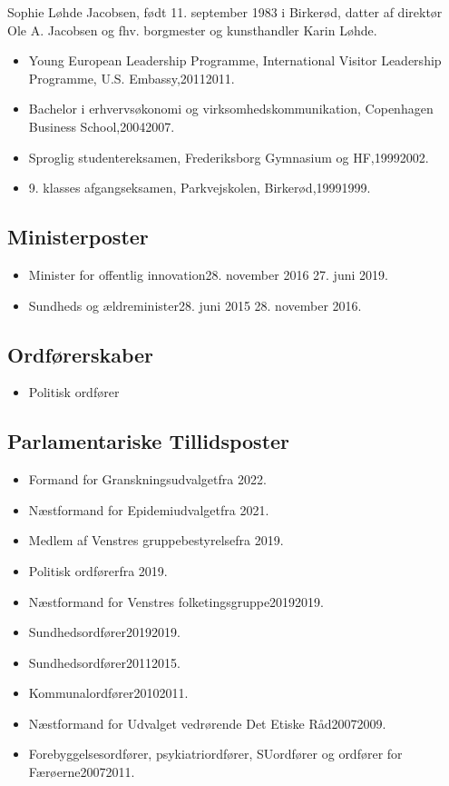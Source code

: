 \documentclass[11pt, a4paper]{awesome-cv}
\begin{document}
\makecvheader[R]
\makelettertitle
\begin{cvletter}
Sophie Løhde Jacobsen, født 11. september 1983 i Birkerød, datter af direktør Ole A. Jacobsen og fhv. borgmester og kunsthandler Karin Løhde.

\begin{itemize}
\item Young European Leadership Programme, International Visitor Leadership Programme, U.S. Embassy,20112011.
\item Bachelor i erhvervsøkonomi og virksomhedskommunikation, Copenhagen Business School,20042007.
\item Sproglig studentereksamen, Frederiksborg Gymnasium og HF,19992002.
\item 9. klasses afgangseksamen, Parkvejskolen, Birkerød,19991999.
\end{itemize}
\subsection*{Ministerposter}
\begin{itemize}
\item Minister for offentlig innovation28. november 2016  27. juni 2019.
\item Sundheds og ældreminister28. juni 2015  28. november 2016.
\end{itemize}
\subsection*{Ordførerskaber}
\begin{itemize}
\item Politisk ordfører
\end{itemize}
\subsection*{Parlamentariske Tillidsposter}
\begin{itemize}
\item Formand for Granskningsudvalgetfra 2022.
\item Næstformand for Epidemiudvalgetfra 2021.
\item Medlem af Venstres gruppebestyrelsefra 2019.
\item Politisk ordførerfra 2019.
\item Næstformand for Venstres folketingsgruppe20192019.
\item Sundhedsordfører20192019.
\item Sundhedsordfører20112015.
\item Kommunalordfører20102011.
\item Næstformand for Udvalget vedrørende Det Etiske Råd20072009.
\item Forebyggelsesordfører, psykiatriordfører, SUordfører og ordfører for Færøerne20072011.
\end{itemize}

\end{cvletter}
\end{document}
